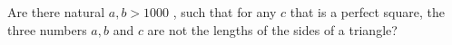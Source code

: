 Are there natural $a, b >1000$ , such that for any $c$ that is a perfect square, the three numbers $a, b$ and $c$ are not the lengths of the sides of a triangle?
